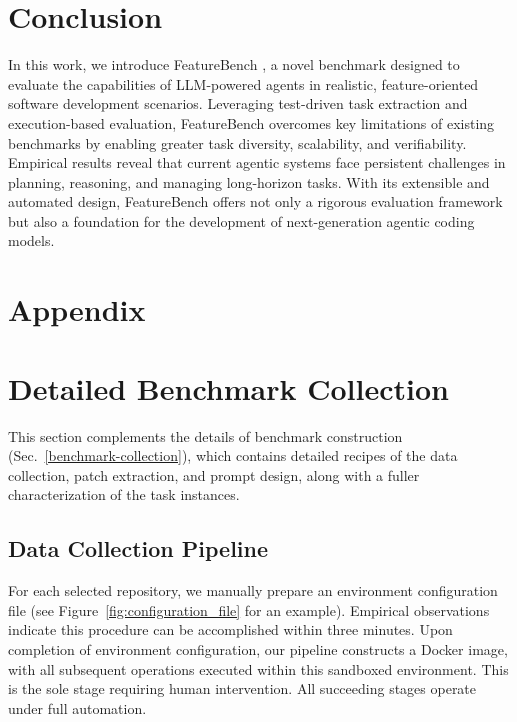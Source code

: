 \documentclass{article}
\newcommand{\myparagraph}[1]{\noindent{\bf #1}}
\def\name{FeatureBench }
\begin{document}
\section{Conclusion}
\label{conclusion}

In this work, we introduce \name, a novel benchmark designed to evaluate the capabilities of LLM-powered agents in realistic, feature-oriented software development scenarios. Leveraging test-driven task extraction and execution-based evaluation, \name overcomes key limitations of existing benchmarks by enabling greater task diversity, scalability, and verifiability. Empirical results reveal that current agentic systems face persistent challenges in planning, reasoning, and managing long-horizon tasks. With its extensible and automated design, \name offers not only a rigorous evaluation framework but also a foundation for the development of next-generation agentic coding models.




\appendix
\newpage

\section*{Appendix} 

\section{Detailed Benchmark Collection}  
This section complements the details of benchmark construction (Sec.~\ref{benchmark-collection}), which contains detailed recipes of the data collection, patch extraction, and prompt design, along with a fuller characterization of the task instances. 

\subsection{Data Collection Pipeline}

\myparagraph{Environment Setup.}

For each selected repository, we manually prepare an environment configuration file (see Figure~\ref{fig:configuration_file} for an example). Empirical observations indicate this procedure can be accomplished within three minutes. Upon completion of environment configuration, our pipeline constructs a Docker image, with all subsequent operations executed within this sandboxed environment. This is the sole stage requiring human intervention. All succeeding stages operate under full automation.
\end{document}
